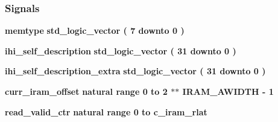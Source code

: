 \subsubsection*{Signals}
 \begin{DoxyCompactItemize}
\item 
{\bf memtype} {\bfseries \textcolor{comment}{std\+\_\+logic\+\_\+vector}\textcolor{vhdlchar}{ }\textcolor{vhdlchar}{(}\textcolor{vhdlchar}{ }\textcolor{vhdlchar}{ } \textcolor{vhdldigit}{7} \textcolor{vhdlchar}{ }\textcolor{keywordflow}{downto}\textcolor{vhdlchar}{ }\textcolor{vhdlchar}{ } \textcolor{vhdldigit}{0} \textcolor{vhdlchar}{ }\textcolor{vhdlchar}{)}\textcolor{vhdlchar}{ }} 
\item 
{\bf ihi\+\_\+self\+\_\+description} {\bfseries \textcolor{comment}{std\+\_\+logic\+\_\+vector}\textcolor{vhdlchar}{ }\textcolor{vhdlchar}{(}\textcolor{vhdlchar}{ }\textcolor{vhdlchar}{ } \textcolor{vhdldigit}{31} \textcolor{vhdlchar}{ }\textcolor{keywordflow}{downto}\textcolor{vhdlchar}{ }\textcolor{vhdlchar}{ } \textcolor{vhdldigit}{0} \textcolor{vhdlchar}{ }\textcolor{vhdlchar}{)}\textcolor{vhdlchar}{ }} 
\item 
{\bf ihi\+\_\+self\+\_\+description\+\_\+extra} {\bfseries \textcolor{comment}{std\+\_\+logic\+\_\+vector}\textcolor{vhdlchar}{ }\textcolor{vhdlchar}{(}\textcolor{vhdlchar}{ }\textcolor{vhdlchar}{ } \textcolor{vhdldigit}{31} \textcolor{vhdlchar}{ }\textcolor{keywordflow}{downto}\textcolor{vhdlchar}{ }\textcolor{vhdlchar}{ } \textcolor{vhdldigit}{0} \textcolor{vhdlchar}{ }\textcolor{vhdlchar}{)}\textcolor{vhdlchar}{ }} 
\item 
{\bf curr\+\_\+iram\+\_\+offset} {\bfseries \textcolor{comment}{natural}\textcolor{vhdlchar}{ }\textcolor{vhdlchar}{ }\textcolor{vhdlchar}{ }\textcolor{keywordflow}{range}\textcolor{vhdlchar}{ }\textcolor{vhdlchar}{ } \textcolor{vhdldigit}{0} \textcolor{vhdlchar}{ }\textcolor{keywordflow}{to}\textcolor{vhdlchar}{ }\textcolor{vhdlchar}{ } \textcolor{vhdldigit}{2} \textcolor{vhdlchar}{$\ast$}\textcolor{vhdlchar}{$\ast$}\textcolor{vhdlchar}{ }\textcolor{vhdlchar}{ }\textcolor{vhdlchar}{ }{\bfseries {\bf I\+R\+A\+M\+\_\+\+A\+W\+I\+D\+TH}} \textcolor{vhdlchar}{-\/}\textcolor{vhdlchar}{ } \textcolor{vhdldigit}{1} \textcolor{vhdlchar}{ }} 
\item 
{\bf read\+\_\+valid\+\_\+ctr} {\bfseries \textcolor{comment}{natural}\textcolor{vhdlchar}{ }\textcolor{vhdlchar}{ }\textcolor{vhdlchar}{ }\textcolor{keywordflow}{range}\textcolor{vhdlchar}{ }\textcolor{vhdlchar}{ } \textcolor{vhdldigit}{0} \textcolor{vhdlchar}{ }\textcolor{keywordflow}{to}\textcolor{vhdlchar}{ }\textcolor{vhdlchar}{ }\textcolor{vhdlchar}{ }\textcolor{vhdlchar}{ }{\bfseries {\bf c\+\_\+iram\+\_\+rlat}} \textcolor{vhdlchar}{ }} 

\end{DoxyCompactItemize}
